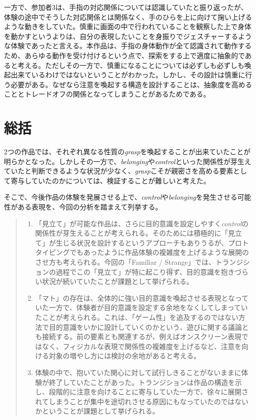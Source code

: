一方で、参加者3は、手指の対応関係については認識していたと振り返ったが、体験の途中でそうした対応関係とは関係なく、手のひらを上に向けて掬い上げるような動きをしていた。慎重に画面の中で行われていることを観察した上で身体を動かすというよりは、自分の表現したいことを身振りでジェスチャーするような体験であったと言える。本作品は、手指の身体動作が全て認識されて動作するため、あらゆる動作を受け付けるという点で、探索をする上で適度に抽象的であると考える。ただしその一方で、慎重になることについては必ずしも必ずしも喚起出来ているわけではないということがわかった。しかし、その設計は慎重に行う必要がある。なぜなら注意を喚起する構造を設計することは、抽象度を高めることとトレードオフの関係となってしまうことがあるためである。

\section{総括}
2つの作品では、それぞれ異なる性質の\textit{grasp}を喚起することが出来ていたことが明らかとなった。しかしその一方で、\textit{belonging}や\textit{control}といった関係性が芽生えていたと判断できるような状況が少なく、\textit{grasp}こそが親密さを高める要素として寄与していたのかについては、検証することが難しいと考えた。

そこで、今後作品の体験を発展させる上で、\textit{control}や\textit{belonging}を発生させる可能性がある表現を、今回の分析を踏まえて列挙する。

\begin{quote}
  \begin{enumerate}
    \item 「見立て」が可能な作品は、さらに目的意識を設定しやすく\textit{control}の関係性が芽生えることが考えられる。そのためには積極的に「見立て」が生じる状況を設計するというアプローチもありうるが、プロトタイピングでもあったように作品体験の複雑度を上げるような展開のさせ方も考えられる。今回の「Familiar / Strange」では、トランジションの過程でこの「見立て」が特に起こり得ず、目的意識を抱きづらい状況が続いていたことが課題として挙げられる。
    \item 「マト」の存在は、全体的に強い目的意識を喚起させる表現となっていた一方で、体験者が目的意識を設定する余地をなくしてしまっていたことが考えられる。これは、「ゲーム性」を追及するのではない方法で目的意識をいかに設計していくのかという、遊びに関する議論とも接続する。前の要素とも関連するが、例えばオンスクリーン表現ではなく、フィジカルな表現で関係性の複雑度を上げるなど、注意を向ける対象の増やし方には検討の余地があると考える。
    \item 体験の中で、抱いていた関心に対して試行しきることがないままに体験が終了していたことがあった。トランジションは作品の構造を示し、段階的に注意を向けることに寄与していた一方で、徐々に展開されてしまうことが集中を途切れさせる原因にもなっていたのではないかということが課題として挙げられる。
  \end{enumerate}
\end{quote}